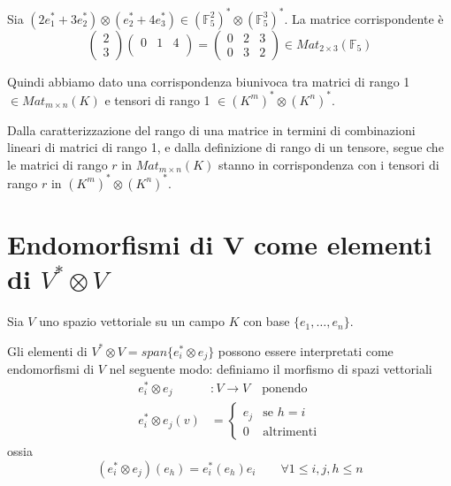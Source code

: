 \documentclass[../main.tex]{subfiles}
\begin{document}
\begin{example}
    Sia $(2 e_1^* + 3 e_2^*) \otimes (e_2^* + 4 e_3^*) \in (\mathbb{F}_5^2)^* \otimes (\mathbb{F}_5^3)^*$. La matrice corrispondente è
    \begin{equation*}
        \begin{pmatrix}
            2 \\
            3
        \end{pmatrix} \begin{pmatrix}
            0 & 1 & 4 \\
        \end{pmatrix} = \begin{pmatrix}
            0 & 2 & 3 \\
            0 & 3 & 2
        \end{pmatrix} \in Mat_{2 \times 3}(\mathbb{F}_5)
    \end{equation*}
\end{example}

Quindi abbiamo dato una corrispondenza biunivoca tra matrici di rango 1 $\in Mat_{m \times n}(K)$ e tensori di rango 1 $\in (K^m)^* \otimes (K^n)^*$.

Dalla caratterizzazione del rango di una matrice in termini di combinazioni lineari di matrici di rango 1, e dalla definizione di rango di un tensore, segue che le matrici di rango $r$ in $Mat_{m \times n}(K)$ stanno in corrispondenza con i tensori di rango $r$ in $(K^m)^* \otimes (K^n)^*$.

\section[Endomorfismi di V come elementi del prodotto tensoriale]{Endomorfismi di V come elementi di $V^* \otimes V$}

Sia $V$ uno spazio vettoriale su un campo $K$ con base $\{e_1,\ldots, e_n\}$.

Gli elementi di $V^* \otimes V = span\{e_i^* \otimes e_j\}$ possono essere interpretati come endomorfismi di $V$ nel seguente modo:
definiamo il morfismo di spazi vettoriali
\begin{align*}
    e_i^* \otimes e_j     & : V \rightarrow V \quad \text{ponendo} \\
    e_i^* \otimes e_j (v) & = \begin{cases}
                                  e_j & \text{se } h = i  \\
                                  0   & \text{altrimenti}
                              \end{cases}
\end{align*}
ossia
\begin{equation*}
    (e_i^* \otimes e_j)(e_h) = e_i^* (e_h) e_i \qquad \forall 1 \leq i,j,h \leq n
\end{equation*}
\end{document}
